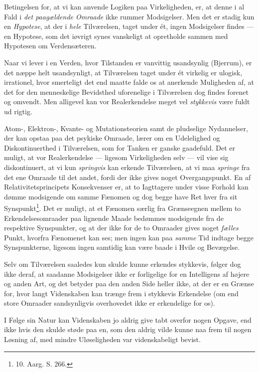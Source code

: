 \documentclass[12pt,a4paper]{article}
\newcommand{\opage}[1]{\marginnote{\footnotesize\textit{[#1]}}}
\begin{document}
Betingelsen for, at vi kan anvende Logiken paa Virkeligheden, er, at
denne i al Fald i \emph{det paagældende Omraade} ikke rummer Modsigelser.
Men det er stadig kun en \emph{Hypotese}, at der i \emph{hele}
Tilværelsen, taget under ét, ingen Modsigelser findes --- en Hypotese,
som det iøvrigt synes vanskeligt at opretholde sammen med Hypotesen om
Verdensæteren.

Naar vi lever i en Verden, hvor Tilstanden er vanvittig usandsynlig
(Bjerrum), er det næppe helt usandsynligt, at Tilværelsen taget under ét
virkelig er ulogisk, irrationel, hvor smerteligt det end maatte falde os
at anerkende Muligheden af, at det for den menneskelige Bevidsthed
uforenelige i Tilværelsen dog findes forenet og omvendt. Men alligevel
kan vor Realerkendelse meget vel \emph{stykkevis} være fuldt ud rigtig.

Atom-, Elektron-, Kvante- og Mutationsteorien samt de pludselige
Nydannelser, der kan opstaa paa det psykiske Omraade, lærer om en
Udelelighed og Diskontinuerthed i Tilværelsen, som for Tanken er ganske
gaadefuld. Det er muligt, at vor Realerkendelse --- ligesom Virkeligheden
selv --- vil vise sig \guillemotleft diskontinuert\guillemotright{}, at
vi kun \emph{springvis} kan erkende Tilværelsen, at vi maa \emph{springe}
fra det ene Omraade
\opage{15} \setcounter{footnote}{0}%
til det andet, fordi der ikke gives noget Overgangspunkt. En af
Relativitetsprincipets Konsekvenser er, at to Iagttagere under visse
Forhold kan dømme modsigende om samme Fænomen og dog begge have Ret hver
fra sit Synspunkt\footnote{10. Aarg. S. 266.}. Det er muligt, at et
Fænomen særlig fra Grænseegnen mellem to Erkendelsesomraader paa lignende
Maade bedømmes modsigende fra de respektive Synspunkter, og at der ikke
for de to Omraader gives noget \emph{fælles} Punkt, hvorfra Fænomenet kan
ses; men ingen kan paa \emph{samme} Tid indtage begge Synspunkterne,
ligesom ingen samtidig kan være baade i Hvile og Bevægelse.

Selv om Tilværelsen saaledes kun skulde kunne erkendes stykkevis, følger
dog ikke deraf, at saadanne \guillemotleft
Modsigelser\guillemotright{} ikke er forligelige for en Intelligens af
højere og anden Art, og det betyder paa den anden Side heller ikke, at
der er en Grænse for, hvor langt Videnskaben kan trænge frem i stykkevis
Erkendelse (om end store Omraader sandsynligvis overhovedet ikke er
erkendelige for os).

I Følge sin Natur kan Videnskaben jo aldrig give tabt overfor nogen
Opgave, end ikke hvis den skulde støde paa en, som den aldrig vilde kunne
naa frem til nogen Løsning af, med mindre Uløseligheden var
videnskabeligt bevist.
\end{document}
